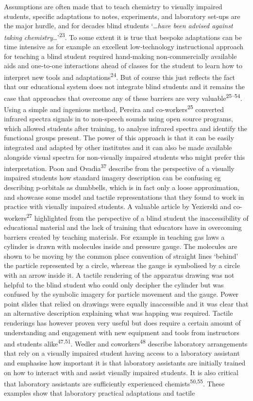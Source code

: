 \documentclass[11.5pt]{sig-alternate} %
\begin{document}
\begin{large}
Assumptions are often made that to teach chemistry to visually impaired students, specific adaptations to notes, experiments, and laboratory set-ups are the major hurdle, and for decades blind students ‘…\textit{have been advised against taking chemistry}…’\textsuperscript{23}. To some extent it is true that bespoke adaptations can be time intensive as for example an excellent low-technology instructional approach for teaching a blind student required hand-making non-commercially available aids and one-to-one interactions ahead of classes for the student to learn how to interpret new tools and adaptations\textsuperscript{24}. But of course this just reflects the fact that our educational system does not integrate blind students and it remains the case that approaches that overcome any of these barriers are very valuable\textsuperscript{25–54}. Using a simple and ingenious method, Pereira and co-workers\textsuperscript{25}  converted infrared spectra signals in to non-speech sounds using open source programs, which allowed students after training, to analyse infrared spectra and identify the functional groups present. The power of this approach is that it can be easily integrated and adapted by other institutes and it can also be made available alongside visual spectra for non-visually impaired students who might prefer this interpretation. Poon and Ovadia\textsuperscript{37} describe from the perspective of a visually impaired students how standard imagery description can be confusing eg describing p-orbitals as dumbbells, which is in fact only a loose approximation, and showcase some model and tactile representations that they found to work in practice with visually impaired students. A valuable article by Yezierski and co-workers\textsuperscript{27} highlighted from the perspective of a blind student the inaccessibility of educational material and the lack of training that educators have in overcoming barriers created by teaching materials. For example in teaching gas laws a cylinder is drawn with molecules inside and pressure gauge. The molecules are shown to be moving by the common place convention of straight lines ‘behind’ the particle represented by a circle, whereas the gauge is symbolised by a circle with an arrow inside it. A tactile rendering of the apparatus drawing was not helpful to the blind student who could only decipher the cylinder but was confused by the symbolic imagery for particle movement and the gauge. Power point slides that relied on drawings were equally inaccessible and it was clear that an alternative description explaining what was happing was required. Tactile renderings has however proven very useful but does require a certain amount of understanding and engagement with new equipment and tools from instructors and students alike\textsuperscript{47,51}. Wedler and coworkers\textsuperscript{48} describe laboratory arrangements that rely on a visually impaired student having access to a laboratory assistant and emphasise how important it is that laboratory assistants are initially trained on how to interact with and assist visually impaired students. It is also critical that laboratory assistants are sufficiently experienced chemists\textsuperscript{50,55}. These examples show that laboratory practical adaptations and tactile 
\end{large}
\end{document}
